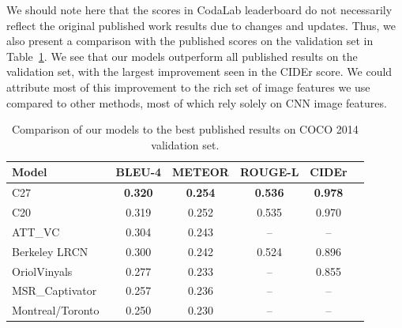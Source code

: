 We should note here that the scores in CodaLab leaderboard do not necessarily
reflect the original published work results due to changes and updates.
Thus, we also present a comparison with the published scores on the validation
set in Table~\ref{tab:resCocPubVal}.
We see that our models outperform all published results on the validation set,
with the largest improvement seen in the CIDEr score.
We could attribute most of this improvement to the rich set of image features we
use compared to other methods, most of which rely solely on CNN image features.
\begin{table}[tp]
  \centering
  \begin{adjustbox}{center}
  \begin{tabular}{|l|c|c|c|c|c|}
    \hline\hline
    \bf Model  &BLEU-4 &METEOR &ROUGE-L&CIDEr\\\hline
    C27 & \bf0.320&\bf0.254 &\bf0.536 &\bf0.978 \\
    C20 & 0.319 & 0.252 & 0.535 & 0.970 \\\hline
    ATT\_VC~\cite{you2016image} & 0.304& 0.243& -- & -- \\
    Berkeley LRCN~\cite{donahue2015long} & 0.300& 0.242& 0.524 & 0.896 \\
    OriolVinyals~\cite{Vinyals_2015_CVPR} & 0.277& 0.233& -- & 0.855 \\
    MSR\_Captivator~\cite{Fang2015} & 0.257& 0.236& -- & -- \\
    Montreal/Toronto~\cite{Xu2015show} & 0.250& 0.230& -- & -- \\
    \hline \hline
  \end{tabular}
  \end{adjustbox}
  \caption{Comparison of our models to the best published results on COCO 2014 validation set.}
  \label{tab:resCocPubVal}
\end{table}


